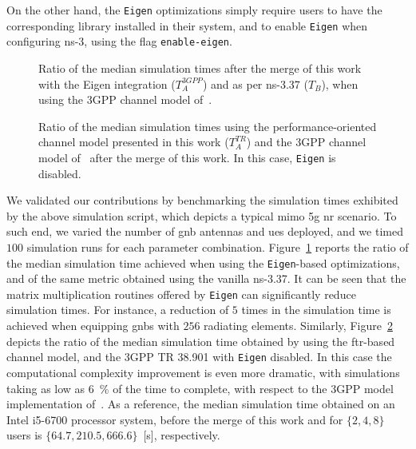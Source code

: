On the other hand, the \texttt{Eigen} optimizations simply require users to have the corresponding library installed in their system, and to enable \texttt{Eigen} when configuring ns-3, using the flag \texttt{enable\--eigen}.

\begin{figure}
    \centering 
    \setlength{}
    \setlength{}
    
    \vspace*{-0.2cm}
    \caption{Ratio of the median simulation times after the merge of this work with the Eigen integration ($T_{A}^{3GPP}$) and as per ns-3.37 ($T_{B}$), when using the 3GPP channel model of~\cite{TR38901}.}
    \label{fig:bench_eigen}
\end{figure}

\begin{figure}
    \centering 
    \setlength{}
    \setlength{}
    
    \vspace*{-0.2cm}
    \caption{Ratio of the median simulation times using the performance-oriented channel model presented in this work ($T_{A}^{TR}$) and the 3GPP channel model of~\cite{TR38901} after the merge of this work. In this case, \texttt{Eigen} is disabled.}
    \label{fig:bench_tworay}
\end{figure}
 
We validated our contributions by benchmarking the simulation times exhibited by the above simulation script, which depicts a typical \gls{mimo} \gls{5g} \gls{nr} scenario. To such end, we varied the number of \gls{gnb} antennas and \glspl{ue} deployed, and we timed $100$ simulation runs for each parameter combination. Figure~\ref{fig:bench_eigen} reports the ratio of the median simulation time achieved when using the \texttt{Eigen}-based optimizations, and of the same metric obtained using the vanilla ns-3.37. It can be seen that the matrix multiplication routines offered by \texttt{Eigen} can significantly reduce simulation times. For instance, a reduction of $5$ times in the simulation time is achieved when equipping \glspl{gnb} with $256$ radiating elements.
Similarly, Figure~\ref{fig:bench_tworay} depicts the ratio of the median simulation time obtained by using the \gls{ftr}-based channel model, and the 3GPP TR 38.901 with \texttt{Eigen} disabled. In this case the computational complexity improvement is even more dramatic, with simulations taking as low as 6~\% of the time to complete, with respect to the 3GPP model implementation of~\cite{tommaso:20}. As a reference, the median simulation time obtained on an Intel\textsuperscript{\textcopyright} i5-6700 processor system, before the merge of this work and for $\{2, 4, 8\}$ users is $\{64.7, 210.5, 666.6\}$~[s], respectively.


